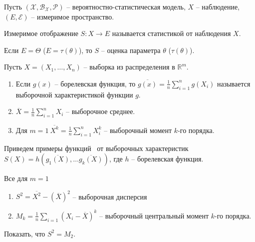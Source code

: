 Пусть $\displaystyle (\mathcal{X} ,\mathcal{B}_{\mathcal{X}} ,\mathcal{P})$ -- вероятностно-статистическая модель, $\displaystyle X$ -- наблюдение, $\displaystyle ( E,\mathcal{E})$ -- измеримое пространство.
\begin{definition}
Измеримое отображение $\displaystyle S:X\rightarrow E$ называется статистикой от наблюдения $\displaystyle X$.
\end{definition}
\begin{definition}
Если $\displaystyle E=\Theta $ ($\displaystyle E=\tau ( \theta )$), то $\displaystyle S$ -- оценка параметра $\displaystyle \theta $ ($\displaystyle \tau ( \theta )$).
\end{definition}
\begin{example}
Пусть $\displaystyle X=( X_{1} ,\dotsc ,X_{n})$ -- выборка из распределения в $\displaystyle \mathbb{R}^{m}$.
\begin{enumerate}
    \item Если $\displaystyle g( x)$ -- борелевская функция, то $\displaystyle \overline{g( x)} =\frac{1}{n}\sum _{i=1}^{n} g( X_{i})$ называется выборочной характеристикой функции $\displaystyle g$.
    
    \item $\displaystyle \overline{X} =\frac{1}{n}\sum _{i=1}^{n} X_{i}$ -- выборочное среднее.
    
    \item Для $\displaystyle m=1\ \overline{X^{k}} =\frac{1}{n}\sum _{i=1}^{n} X_{i}^{k}$ -- выборочный момент $\displaystyle k$-го порядка.
\end{enumerate}
\end{example}
Приведем примеры функций \ от выборочных характеристик $\displaystyle S( X) =h\left(\overline{g_{1}( X)} ,\dotsc \overline{g_{k}( X)}\right)$, где $\displaystyle h$ -- борелевская функция.
\begin{example}
Все для $\displaystyle m=1$
\begin{enumerate}
    \item $\displaystyle S^{2} =\overline{X^{2}} -(\overline{X})^{2}$ -- выборочная дисперсия
    
    \item $\displaystyle M_{k} =\frac{1}{n}\sum _{i=1}( X_{i} -\overline{X})^{k}$ -- выборочный центральный момент $\displaystyle k$-го порядка.
\end{enumerate}
\end{example}
\begin{exercise}
Показать, что $\displaystyle S^{2} =M_{2}$.
\end{exercise}

